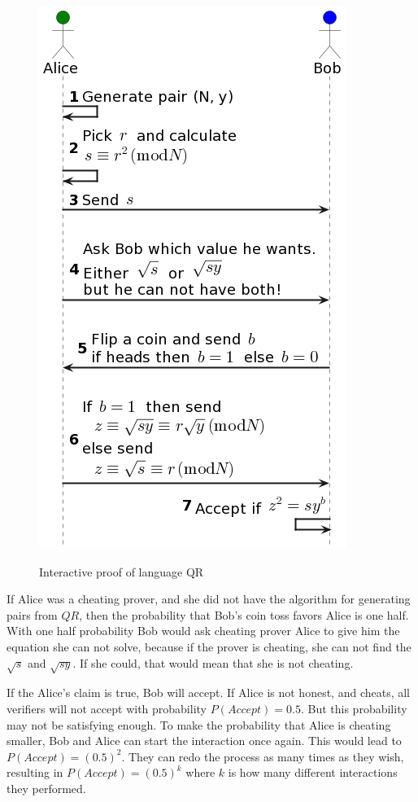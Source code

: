 \documentclass[conference,comsoc,10pt]{IEEEtran}
\begin{document}
        \begin{figure}[h!]
            \centering
            \includegraphics[scale=0.5]{../bachelor/assets/images/qr_ip.png}
            \caption{Interactive proof of language QR}
            \cite{Goldwasser1989, youtubeMOOCLecture1}
            \label{fig:qr_ip}
            \vspace{0.5cm}
        \end{figure}


        If Alice was a cheating prover, and she did not have the algorithm for
        generating pairs from $QR$, then the probability that Bob's coin toss favors
        Alice is one half. With one half probability Bob would ask cheating prover
        Alice to give him the equation she can not solve, because if the prover is
        cheating, she can not find the $\sqrt{s}$ and $\sqrt{sy}$. If she could,
        that would mean that she is not cheating.

        If the Alice's claim is true, Bob will accept. If Alice is not honest, and
        cheats, all verifiers will not accept with probability $P(Accept) = 0.5$.
        But this probability may not be satisfying enough. To make the probability
        that Alice is cheating smaller, Bob and Alice can start the interaction once
        again. This would lead to $P(Accept) = (0.5)^2$. They can redo the process
        as many times as they wish, resulting in $P(Accept) = (0.5)^k$ where $k$
        is how many different interactions they performed.
\end{document}
